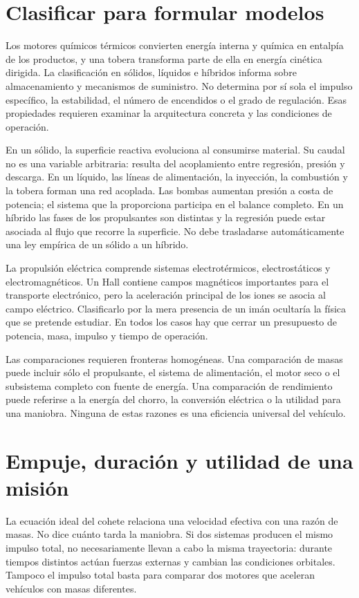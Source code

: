\section{Clasificar para formular modelos}
Los motores químicos térmicos convierten energía interna y química en entalpía de los productos, y una tobera transforma parte de ella en energía cinética dirigida. La clasificación en sólidos, líquidos e híbridos informa sobre almacenamiento y mecanismos de suministro. No determina por sí sola el impulso específico, la estabilidad, el número de encendidos o el grado de regulación. Esas propiedades requieren examinar la arquitectura concreta y las condiciones de operación.

En un sólido, la superficie reactiva evoluciona al consumirse material. Su caudal no es una variable arbitraria: resulta del acoplamiento entre regresión, presión y descarga. En un líquido, las líneas de alimentación, la inyección, la combustión y la tobera forman una red acoplada. Las bombas aumentan presión a costa de potencia; el sistema que la proporciona participa en el balance completo. En un híbrido las fases de los propulsantes son distintas y la regresión puede estar asociada al flujo que recorre la superficie. No debe trasladarse automáticamente una ley empírica de un sólido a un híbrido.

La propulsión eléctrica comprende sistemas electrotérmicos, electrostáticos y electromagnéticos. Un Hall contiene campos magnéticos importantes para el transporte electrónico, pero la aceleración principal de los iones se asocia al campo eléctrico. Clasificarlo por la mera presencia de un imán ocultaría la física que se pretende estudiar. En todos los casos hay que cerrar un presupuesto de potencia, masa, impulso y tiempo de operación.

Las comparaciones requieren fronteras homogéneas. Una comparación de masas puede incluir sólo el propulsante, el sistema de alimentación, el motor seco o el subsistema completo con fuente de energía. Una comparación de rendimiento puede referirse a la energía del chorro, la conversión eléctrica o la utilidad para una maniobra. Ninguna de estas razones es una eficiencia universal del vehículo.
\section{Empuje, duración y utilidad de una misión}
La ecuación ideal del cohete relaciona una velocidad efectiva con una razón de masas. No dice cuánto tarda la maniobra. Si dos sistemas producen el mismo impulso total, no necesariamente llevan a cabo la misma trayectoria: durante tiempos distintos actúan fuerzas externas y cambian las condiciones orbitales. Tampoco el impulso total basta para comparar dos motores que aceleran vehículos con masas diferentes.


